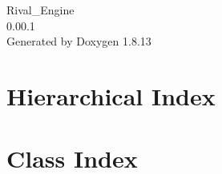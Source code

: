 \documentclass[twoside]{book}
\newcommand{\+}{\discretionary{\mbox{\scriptsize$\hookleftarrow$}}{}{}}
\newcommand{\clearemptydoublepage}{%
  \newpage{\pagestyle{empty}\cleardoublepage}%
}
\begin{document}
\hypersetup{pageanchor=false,
             bookmarksnumbered=true,
             pdfencoding=unicode
            }
\begin{titlepage}
\vspace*{7cm}
\begin{center}%
{\Large Rival\+\_\+\+Engine \\[1ex]\large 0.\+00.\+1 }\\
\vspace*{1cm}
{\large Generated by Doxygen 1.8.13}\\
\end{center}
\end{titlepage}
\clearemptydoublepage
{}
\tableofcontents
\clearemptydoublepage
{}
\hypersetup{pageanchor=true}

\chapter{Hierarchical Index}

\chapter{Class Index}

\end{document}
